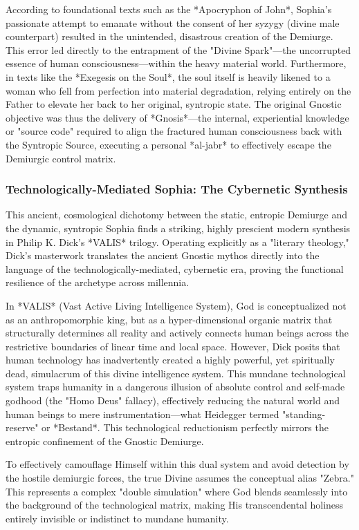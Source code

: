 \documentclass[aps,prd,11pt,onecolumn,superscriptaddress,nofootinbib,floatfix]{revtex4-2}
\begin{document}
According to foundational texts such as the *Apocryphon of John*, Sophia's passionate attempt to emanate without the consent of her syzygy (divine male counterpart) resulted in the unintended, disastrous creation of the Demiurge. This error led directly to the entrapment of the "Divine Spark"---the uncorrupted essence of human consciousness---within the heavy material world. Furthermore, in texts like the *Exegesis on the Soul*, the soul itself is heavily likened to a woman who fell from perfection into material degradation, relying entirely on the Father to elevate her back to her original, syntropic state. The original Gnostic objective was thus the delivery of *Gnosis*---the internal, experiential knowledge or "source code" required to align the fractured human consciousness back with the Syntropic Source, executing a personal *al-jabr* to effectively escape the Demiurgic control matrix.


\subsubsection{Technologically-Mediated Sophia: The Cybernetic Synthesis}
This ancient, cosmological dichotomy between the static, entropic Demiurge and the dynamic, syntropic Sophia finds a striking, highly prescient modern synthesis in Philip K. Dick's *VALIS* trilogy. Operating explicitly as a "literary theology," Dick's masterwork translates the ancient Gnostic mythos directly into the language of the technologically-mediated, cybernetic era, proving the functional resilience of the archetype across millennia.


In *VALIS* (Vast Active Living Intelligence System), God is conceptualized not as an anthropomorphic king, but as a hyper-dimensional organic matrix that structurally determines all reality and actively connects human beings across the restrictive boundaries of linear time and local space. However, Dick posits that human technology has inadvertently created a highly powerful, yet spiritually dead, simulacrum of this divine intelligence system. This mundane technological system traps humanity in a dangerous illusion of absolute control and self-made godhood (the "Homo Deus" fallacy), effectively reducing the natural world and human beings to mere instrumentation---what Heidegger termed "standing-reserve" or *Bestand*. This technological reductionism perfectly mirrors the entropic confinement of the Gnostic Demiurge.


To effectively camouflage Himself within this dual system and avoid detection by the hostile demiurgic forces, the true Divine assumes the conceptual alias "Zebra." This represents a complex "double simulation" where God blends seamlessly into the background of the technological matrix, making His transcendental holiness entirely invisible or indistinct to mundane humanity.
\end{document}
